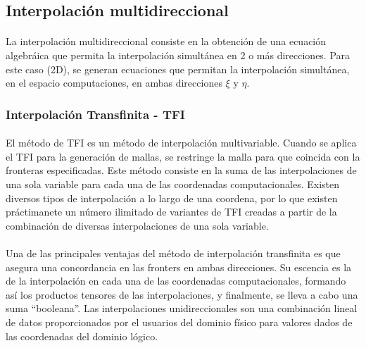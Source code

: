\documentclass[letterpaper, openright, 12pt]{book}
\begin{document}
    \subsection{Interpolación multidireccional}
    \paragraph*{}
        La interpolación multidireccional consiste en la obtención de una
        ecuación algebráica que permita la interpolación simultánea en 2 o más
        direcciones. Para este caso (2D), se generan ecuaciones que permitan la
        interpolación simultánea, en el espacio computaciones, en ambas
        direcciones $\xi$ y $\eta$.
    \subsubsection{Interpolación Transfinita - TFI}
    \paragraph*{}
        El método de TFI es un método de interpolación multivariable. Cuando se
        aplica el TFI para la generación de mallas, se restringe la malla para
        que coincida con la fronteras especificadas. Este método consiste en la
        suma de las interpolaciones de una sola variable para cada una de las
        coordenadas computacionales. Existen diversos tipos de interpolación a
        lo largo de una coordena, por lo que existen práctimanete un número
        ilimitado de variantes de TFI creadas a partir de la combinación de
        diversas interpolaciones de una sola variable.\cite{thompsonhandbook}
    \paragraph*{}
        Una de las principales ventajas del método de interpolación transfinita
        es que asegura una concordancia en las fronters en ambas direcciones.
        Su escencia es la de la interpolación en cada una de las coordenadas
        computacionales, formando así los productos tensores de las
        interpolaciones, y finalmente, se lleva a cabo una suma ``booleana''.
        Las interpolaciones unidireccionales son una combinación lineal de datos
        proporcionados por el usuarios del dominio físico para valores dados de
        las coordenadas del dominio lógico.
\end{document}
